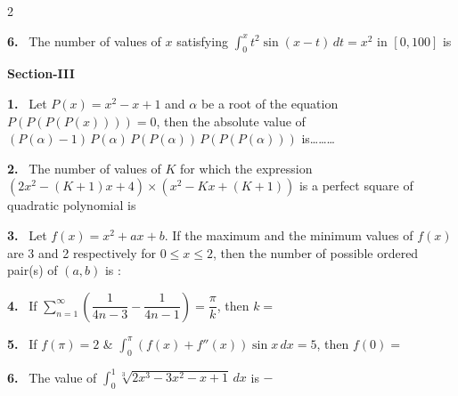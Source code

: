 \documentclass[10pt]{extarticle}
\newcommand{\sect}[1]{\par\smallskip\noindent\textbf{#1}\par}
\newcommand{\qn}[1]{\par\smallskip\noindent\textbf{#1.}~}
\begin{document}
\begin{multicols}{2}
\qn{6} The number of values of $x$ satisfying $\displaystyle\int_0^{x}t^2\sin(x-t)\,dt=x^2$ in $[0,100]$ is
\sect{Section-III}
\qn{1} Let $P(x)=x^2-x+1$ and $\alpha$ be a root of the equation $P(P(P(P(x))))=0$, then the absolute value of $(P(\alpha)-1)\,P(\alpha)\,P(P(\alpha))\,P(P(P(\alpha)))$ is\ldots\ldots\ldots
\qn{2} The number of values of $K$ for which the expression $\left(2x^2-(K+1)x+4\right)\times\left(x^2-Kx+(K+1)\right)$ is a perfect square of quadratic polynomial is \underline{\hspace{1.5em}}
\qn{3} Let $f(x)=x^2+ax+b$. If the maximum and the minimum values of $f(x)$ are 3 and 2 respectively for $0\le x\le2$, then the number of possible ordered pair(s) of $(a,b)$ is :
\qn{4} If $\displaystyle\sum_{n=1}^{\infty}\left(\dfrac1{4n-3}-\dfrac1{4n-1}\right)=\dfrac\pi k$, then $k=$ \underline{\hspace{2.5em}}
\qn{5} If $f(\pi)=2$ \& $\displaystyle\int_0^{\pi}\left(f(x)+f''(x)\right)\sin x\,dx=5$, then $f(0)=$ \underline{\hspace{2.5em}}
\qn{6} The value of $\displaystyle\int_0^{1}\sqrt[3]{2x^3-3x^2-x+1}\,dx$ is $-$
\end{multicols}
\end{document}
